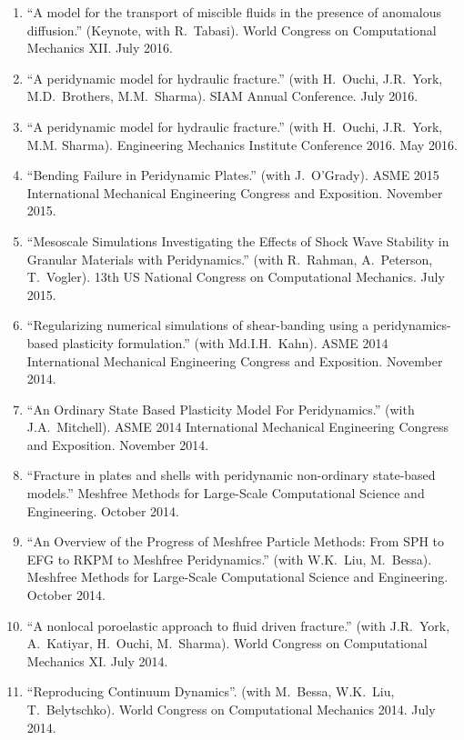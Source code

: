 \begin{etaremune}
\else
\begin{enumerate}
\fi
    \item ``A model for the transport of miscible fluids in the presence of anomalous diffusion.'' (Keynote, with R.\ Tabasi). World Congress on Computational Mechanics XII.  July 2016.
    \item ``A peridynamic model for hydraulic fracture.'' (with H.\ Ouchi, J.R.\ York, M.D.\ Brothers, M.M.\ Sharma). SIAM Annual Conference.  July 2016.
    \item ``A peridynamic model for hydraulic fracture.'' (with H.\ Ouchi, J.R.\ York, M.M. Sharma). Engineering Mechanics Institute Conference 2016. May 2016.
    \item ``Bending Failure in Peridynamic Plates.'' (with J.~O'Grady). ASME 2015 International Mechanical Engineering Congress and Exposition. November 2015.
    \item ``Mesoscale Simulations Investigating the Effects of Shock Wave Stability in Granular Materials with Peridynamics.'' (with R.~Rahman, A.~Peterson, T.~Vogler). 13th US National Congress on Computational Mechanics. July 2015.
    \item ``Regularizing numerical simulations of shear-banding using a peridynamics-based plasticity formulation.'' (with Md.I.H.~Kahn). ASME 2014 International Mechanical Engineering Congress and Exposition. November 2014.
    \item ``An Ordinary State Based Plasticity Model For Peridynamics.'' (with J.A.~Mitchell). ASME 2014 International Mechanical Engineering Congress and Exposition. November 2014.
    \item ``Fracture in plates and shells with peridynamic non-ordinary state-based models.''  Meshfree Methods for Large-Scale Computational Science and Engineering. October 2014.
    \item ``An Overview of the Progress of Meshfree Particle Methods: From SPH to EFG to RKPM to Meshfree Peridynamics.'' (with W.K.~Liu, M.~Bessa). Meshfree Methods for Large-Scale Computational Science and Engineering. October 2014.
    \item ``A nonlocal poroelastic approach to fluid driven fracture.'' (with J.R.~York, A.~Katiyar, H.~Ouchi, M.~Sharma). World Congress on Computational Mechanics XI.  July 2014.
    \item ``Reproducing Continuum Dynamics''. (with M.~Bessa, W.K.~Liu, T.~Belytschko). World Congress on Computational Mechanics 2014.  July 2014.

\end{enumerate}
\end{etaremune}

